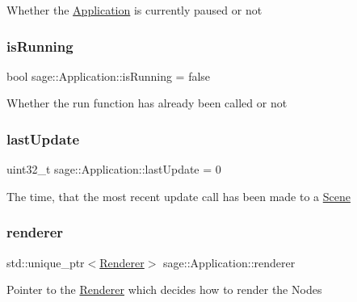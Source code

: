 Whether the \mbox{\hyperlink{classsage_1_1Application}{Application}} is currently paused or not \mbox{\label{classsage_1_1Application_aa5197cd07379bdbc371c26c21f936c17}} 
\subsubsection{\texorpdfstring{isRunning}{isRunning}}
{\footnotesize\ttfamily bool sage\+::\+Application\+::is\+Running = false\hspace{0.3cm}{\ttfamily [private]}}

Whether the run function has already been called or not \mbox{\label{classsage_1_1Application_a08facf4df89e707b2a07a1be0782643a}} 
\subsubsection{\texorpdfstring{lastUpdate}{lastUpdate}}
{\footnotesize\ttfamily uint32\+\_\+t sage\+::\+Application\+::last\+Update = 0\hspace{0.3cm}{\ttfamily [private]}}

The time, that the most recent update call has been made to a \mbox{\hyperlink{classsage_1_1Scene}{Scene}} \mbox{\label{classsage_1_1Application_ac0297e6d65ef3662c807f4026f63c8ba}} 
\subsubsection{\texorpdfstring{renderer}{renderer}}
{\footnotesize\ttfamily std\+::unique\+\_\+ptr$<$\mbox{\hyperlink{classsage_1_1Renderer}{Renderer}}$>$ sage\+::\+Application\+::renderer\hspace{0.3cm}{\ttfamily [private]}}

Pointer to the \mbox{\hyperlink{classsage_1_1Renderer}{Renderer}} which decides how to render the Nodes \mbox{\label{classsage_1_1Application_a3365f5f5f8f63eeca5e778ded7dbe210}} 
